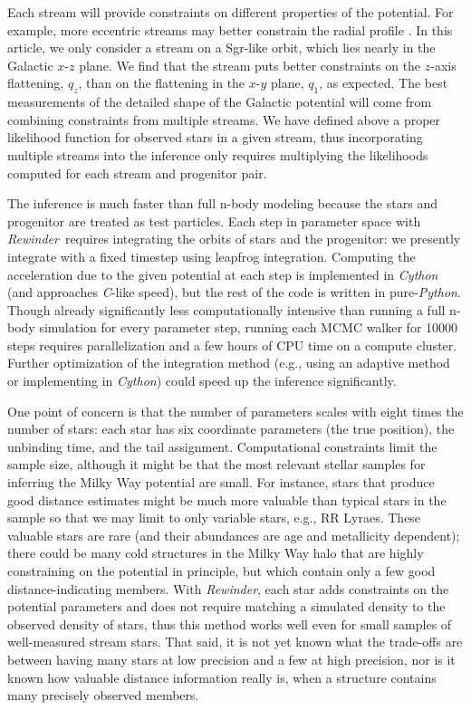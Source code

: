 \documentclass[letterpaper,12pt,preprint]{aastex}
\newcommand{\project}[1]{\textsl{#1}}
\newcommand{\rewinder}{\emph{Rewinder}}
\begin{document}
Each stream will provide constraints on different properties of the potential. For example, more eccentric streams may better constrain the radial profile \citep[see][who illustrate the power of using multiple streams to simultaneously constrain the potential using orbit fitting]{deg14}. In this article, we only consider a stream on a Sgr-like orbit, which lies nearly in the Galactic $x$-$z$ plane. We find that the stream puts better constraints on the $z$-axis flattening, $q_z$, than on the flattening in the $x$-$y$ plane, $q_1$, as expected. The best measurements of the detailed shape of the Galactic potential will come from combining constraints from multiple streams. We have defined above a proper likelihood function for observed stars in a given stream, thus incorporating multiple streams into the inference only requires multiplying the likelihoods computed for each stream and progenitor pair.

The inference is much faster than full n-body modeling because the stars and progenitor are treated as test particles. Each step in parameter space with \rewinder\, requires integrating the orbits of stars and the progenitor: we presently integrate with a fixed timestep using leapfrog integration. Computing the acceleration due to the given potential at each step is implemented in \project{Cython} (and approaches \project{C}-like speed), but the rest of the code is written in pure-\project{Python}. Though already significantly less computationally intensive than running a full n-body simulation for every parameter step, running each MCMC walker for 10000 steps requires parallelization and a few hours of CPU time on a compute cluster. Further optimization of the integration method (e.g., using an adaptive method or implementing in \project{Cython}) could speed up the inference significantly. 

One point of concern is that the number of parameters scales with eight times the number of stars: each star has six coordinate parameters (the true position), the unbinding time, and the tail assignment. Computational constraints limit the sample size, although it might be that the most relevant stellar samples for inferring the Milky Way potential are small. For instance, stars that produce good distance estimates might be much more valuable than typical stars in the sample so that we may limit to only variable stars, e.g., RR Lyraes. These valuable stars are rare (and their abundances are age and metallicity dependent); there could be many cold structures in the Milky Way halo that are highly constraining on the potential in principle, but which contain only a few good distance-indicating members. With \rewinder, each star adds constraints on the potential parameters and does not require matching a simulated density to the observed density of stars, thus this method works well even for small samples of well-measured stream stars. That said, it is not yet known what the trade-offs are between having many stars at low precision and a few at high precision, nor is it known how valuable distance information really is, when a structure contains many precisely observed members. 
\end{document}
